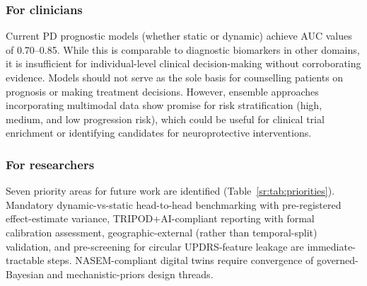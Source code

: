 \subsubsection{For clinicians}
Current PD prognostic models (whether static or dynamic) achieve AUC values of 0.70--0.85. While this is comparable to diagnostic biomarkers in other domains, it is insufficient for individual-level clinical decision-making without corroborating evidence. Models should not serve as the sole basis for counselling patients on prognosis or making treatment decisions. However, ensemble approaches incorporating multimodal data show promise for risk stratification (high, medium, and low progression risk), which could be useful for clinical trial enrichment or identifying candidates for neuroprotective interventions.

\subsubsection{For researchers}
Seven priority areas for future work are identified (Table~\ref{sr:tab:priorities}). Mandatory dynamic-vs-static head-to-head benchmarking with pre-registered effect-estimate variance, TRIPOD+AI-compliant reporting with formal calibration assessment, geographic-external (rather than temporal-split) validation, and pre-screening for circular UPDRS-feature leakage are immediate-tractable steps. NASEM-compliant digital twins require convergence of governed-Bayesian and mechanistic-priors design threads.

